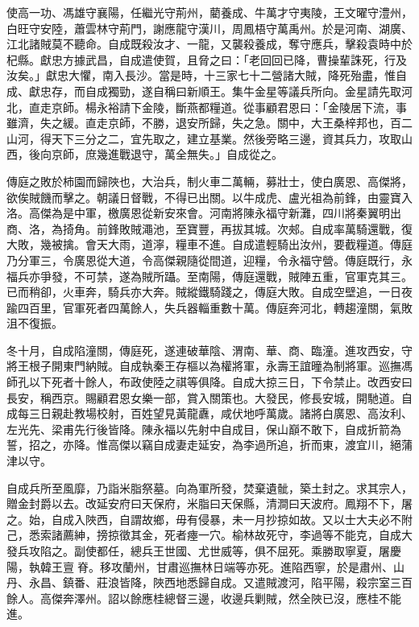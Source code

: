 \begin{pinyinscope}
使高一功、馮雄守襄陽，任繼光守荊州，藺養成、牛萬才守夷陵，王文曜守澧州，白旺守安陸，蕭雲林守荊門，謝應龍守漢川，周鳳梧守萬禹州。於是河南、湖廣、江北諸賊莫不聽命。自成既殺汝才、一龍，又襲殺養成，奪守應兵，擊殺袁時中於杞縣。獻忠方據武昌，自成遣使賀，且脅之曰：「老回回已降，曹操輩誅死，行及汝矣。」獻忠大懼，南入長沙。當是時，十三家七十二營諸大賊，降死殆盡，惟自成、獻忠存，而自成獨勁，遂自稱曰新順王。集牛金星等議兵所向。金星請先取河北，直走京師。楊永裕請下金陵，斷燕都糧道。從事顧君恩曰：「金陵居下流，事雖濟，失之緩。直走京師，不勝，退安所歸，失之急。關中，大王桑梓邦也，百二山河，得天下三分之二，宜先取之，建立基業。然後旁略三邊，資其兵力，攻取山西，後向京師，庶幾進戰退守，萬全無失。」自成從之。

傳庭之敗於柿園而歸陜也，大治兵，制火車二萬輛，募壯士，使白廣恩、高傑將，欲俟賊饑而擊之。朝議日督戰，不得已出關。以牛成虎、盧光祖為前鋒，由靈寶入洛。高傑為是中軍，檄廣恩從新安來會。河南將陳永福守新灘，四川將秦翼明出商、洛，為掎角。前鋒敗賊澠池，至寶豐，再拔其城。次郟。自成率萬騎還戰，復大敗，幾被擒。會天大雨，道濘，糧車不進。自成遣輕騎出汝州，要截糧道。傳庭乃分軍三，令廣恩從大道，令高傑親隨從間道，迎糧，令永福守營。傳庭既行，永福兵亦爭發，不可禁，遂為賊所躡。至南陽，傳庭還戰，賊陣五重，官軍克其三。已而稍卻，火車奔，騎兵亦大奔。賊縱鐵騎踐之，傳庭大敗。自成空壁追，一日夜踰四百里，官軍死者四萬餘人，失兵器輜重數十萬。傳庭奔河北，轉趨潼關，氣敗沮不復振。

冬十月，自成陷潼關，傳庭死，遂連破華陰、渭南、華、商、臨潼。進攻西安，守將王根子開東門納賊。自成執秦王存樞以為權將軍，永壽王誼曈為制將軍。巡撫馮師孔以下死者十餘人，布政使陸之祺等俱降。自成大掠三日，下令禁止。改西安曰長安，稱西京。賜顧君恩女樂一部，賞入關策也。大發民，修長安城，開馳道。自成每三日親赴教場校射，百姓望見黃龍纛，咸伏地呼萬歲。諸將白廣恩、高汝利、左光先、梁甫先行後皆降。陳永福以先射中自成目，保山巔不敢下，自成折箭為誓，招之，亦降。惟高傑以竊自成妻走延安，為李過所追，折而東，渡宜川，絕蒲津以守。

自成兵所至風靡，乃詣米脂祭墓。向為軍所發，焚棄遺骴，築土封之。求其宗人，贈金封爵以去。改延安府曰天保府，米脂曰天保縣，清澗曰天波府。鳳翔不下，屠之。始，自成入陜西，自謂故鄉，毋有侵暴，未一月抄掠如故。又以士大夫必不附己，悉索諸薦紳，搒掠徵其金，死者瘞一穴。榆林故死守，李過等不能克，自成大發兵攻陷之。副使都任，總兵王世國、尤世威等，俱不屈死。乘勝取寧夏，屠慶陽，執韓王亶脊。移攻蘭州，甘肅巡撫林日端等亦死。進陷西寧，於是肅州、山丹、永昌、鎮番、莊浪皆降，陜西地悉歸自成。又遣賊渡河，陷平陽，殺宗室三百餘人。高傑奔澤州。詔以餘應桂總督三邊，收邊兵剿賊，然全陜已沒，應桂不能進。


\end{pinyinscope}
